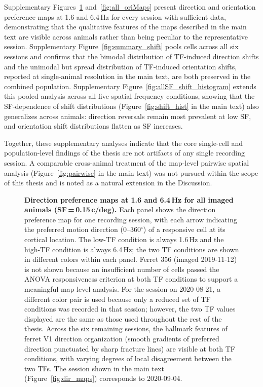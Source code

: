 \documentclass{brandeis-thesis3.3}
\begin{document}
Supplementary Figures~\ref{fig:all_dirMaps}
and~\ref{fig:all_oriMaps} present direction and orientation
preference maps at 1.6 and 6.4\,Hz for every session with
sufficient data, demonstrating that the qualitative features of
the maps described in the main text are visible across
animals rather than being peculiar to the representative
session. Supplementary Figure~\ref{fig:summary_shift} pools
cells across all six sessions and confirms that the bimodal
distribution of TF-induced direction shifts and the unimodal but
spread distribution of TF-induced orientation shifts, reported
at single-animal resolution in the main text, are both preserved
in the combined population. Supplementary
Figure~\ref{fig:allSF_shift_histogram} extends this pooled
analysis across all five spatial frequency conditions, showing
that the SF-dependence of shift distributions
(Figure~\ref{fig:shift_hist} in the main text) also generalizes
across animals: direction reversals remain most prevalent at low
SF, and orientation shift distributions flatten as SF increases.

Together, these supplementary analyses indicate that the core
single-cell and population-level findings of the thesis are not
artifacts of any single recording session. A comparable
cross-animal treatment of the map-level pairwise spatial
analysis (Figure~\ref{fig:pairwise} in the main text) was not
pursued within the scope of this thesis and is noted as a
natural extension in the Discussion.


\begin{figure}[htbp]
    \centering
    
    \caption[Direction preference maps across all animals]{%
    \textbf{Direction preference maps at 1.6 and 6.4\,Hz for all
    imaged animals (SF\,=\,0.15\,c/deg).}
    Each panel shows the direction preference map for one recording
    session, with each arrow indicating the preferred motion
    direction (0--360$^\circ$) of a responsive cell at its cortical
    location. The low-TF condition is always 1.6\,Hz and the
    high-TF condition is always 6.4\,Hz; the two TF conditions are
    shown in different colors within each panel. Ferret 356 (imaged
    2019-11-12) is not shown because an insufficient number of
    cells passed the ANOVA responsiveness criterion at both TF
    conditions to support a meaningful map-level analysis. For the
    session on 2020-08-21, a different color pair is used because
    only a reduced set of TF conditions was recorded in that
    session; however, the two TF values displayed are the same as
    those used throughout the rest of the thesis. Across the six
    remaining sessions, the hallmark features of ferret V1 direction
    organization (smooth gradients of preferred direction
    punctuated by sharp fracture lines) are visible at both TF
    conditions, with varying degrees of local disagreement between
    the two TFs. The session shown in the main text
    (Figure~\ref{fig:dir_maps}) corresponds to 2020-09-04.}
    \label{fig:all_dirMaps}
\end{figure}
\end{document}
